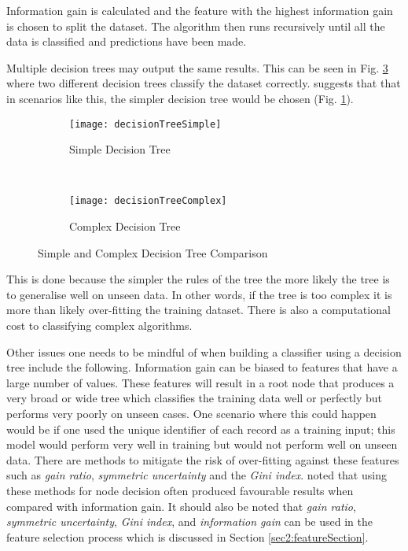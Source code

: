 Information gain is calculated and the feature with the highest information gain is chosen to split the dataset. The algorithm then runs recursively until all the data is classified and predictions have been made. 

Multiple decision trees may output the same results. This can be seen in Fig. \ref{fig:simpleComplex} where two different decision trees classify the dataset correctly. \cite{quinlan_induction_1986} suggests that that in scenarios like this, the simpler decision tree would be chosen (Fig. \ref{fig:simple}).

\begin{figure}[H]
	\centering
	\begin{subfigure}[b]{0.45\textwidth}
		\captionsetup{font=scriptsize}
		\texttt{[image: decisionTreeSimple]}
		\caption{Simple Decision Tree}\label{fig:decisionTreeSimple}
		\label{fig:simple}
	\end{subfigure} ~\quad
	\begin{subfigure}[b]{0.45\textwidth}
		\captionsetup{font=scriptsize}
		\texttt{[image: decisionTreeComplex]}
		\caption{Complex Decision Tree}\label{fig:decisionTreeComplex}
		\label{fig:complex}
	\end{subfigure}
	\caption{Simple and Complex Decision Tree Comparison\\\cite[Source:][]{quinlan_induction_1986}}
	\label{fig:simpleComplex}
\end{figure}

This is done because the simpler the rules of the tree the more likely the tree is to generalise well on unseen data. In other words, if the tree is too complex it is more than likely over-fitting the training dataset. There is also a computational cost to classifying complex algorithms. 

 Other issues one needs to be mindful of when building a classifier using a decision tree include the following. Information gain can be biased to features that have a large number of values. These features will result in a root node that produces a very broad or wide tree which classifies the training data well or perfectly but performs very poorly on unseen cases. One scenario where this could happen would be if one used the unique identifier of each record  as a training input; this model would perform very well in training but would not perform well on unseen data. There are methods to mitigate the risk of over-fitting against these features such as \textit{gain ratio}, \textit{symmetric uncertainty} and the \textit{Gini index}. \cite{quinlan_induction_1986} noted that using these methods for node decision often produced favourable results when compared with information gain. It should also be noted that \textit{gain ratio}, \textit{symmetric uncertainty}, \textit{Gini index}, and \textit{information gain} can be used in the feature selection process which is discussed in Section \ref{sec2:featureSection}.

